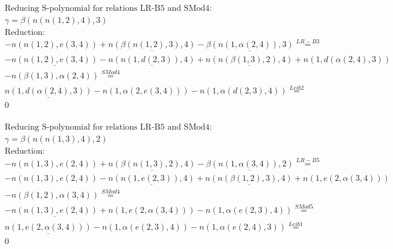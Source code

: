 \documentclass[11pt]{amsart}
\begin{document}
\begin{align*} 
& \text{Reducing S-polynomial for relations LR-B5 and SMod4:} \\ 
& \gamma = \beta(n(n(1,2),4),3) \\ 
& \text{Reduction}: \\& - n(n(1,2),e(3,4)) + \underline{n(\beta(n(1,2),3),4)} - \underline{\beta(n(1,\alpha(2,4)),3)} \stackrel{ LR-B3 }{=}  \\ 
& - \underline{n(n(1,2),e(3,4))} - \underline{n(n(1,d(2,3)),4)} + \underline{n(n(\beta(1,3),2),4)} + n(1,d(\alpha(2,4),3))\\ 
 &  - n(\beta(1,3),\alpha(2,4)) \stackrel{ SMod4 }{=}  \\ 
&\underline{n(1,d(\alpha(2,4),3))} - n(1,\alpha(2,e(3,4))) - n(1,\alpha(d(2,3),4)) \stackrel{ Leib2 }{=}  \\ 
&0\\ 
\end{align*} 
 
\begin{align*} 
& \text{Reducing S-polynomial for relations LR-B5 and SMod4:} \\ 
& \gamma = \beta(n(n(1,3),4),2) \\ 
& \text{Reduction}: \\& - n(n(1,3),e(2,4)) + \underline{n(\beta(n(1,3),2),4)} - \underline{\beta(n(1,\alpha(3,4)),2)} \stackrel{ LR-B5 }{=}  \\ 
& - n(n(1,3),e(2,4)) - \underline{n(n(1,e(2,3)),4)} + \underline{n(n(\beta(1,2),3),4)} + n(1,e(2,\alpha(3,4)))\\ 
 &  - n(\beta(1,2),\alpha(3,4)) \stackrel{ SMod4 }{=}  \\ 
& - \underline{n(n(1,3),e(2,4))} + n(1,e(2,\alpha(3,4))) - n(1,\alpha(e(2,3),4)) \stackrel{ SMod5 }{=}  \\ 
&\underline{n(1,e(2,\alpha(3,4)))} - n(1,\alpha(e(2,3),4)) - n(1,\alpha(e(2,4),3)) \stackrel{ Leib1 }{=}  \\ 
&0\\ 
\end{align*} 
 
\end{document}
